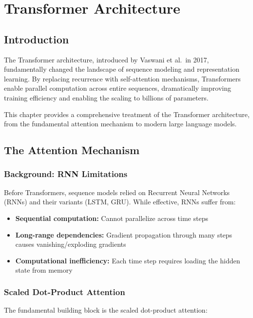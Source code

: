 \clearpage
\cleardoublepage

\chapter{Transformer Architecture}

\section{Introduction}

The Transformer architecture, introduced by Vaswani et al.\ in 2017, fundamentally changed the landscape of sequence modeling and representation learning. By replacing recurrence with self-attention mechanisms, Transformers enable parallel computation across entire sequences, dramatically improving training efficiency and enabling the scaling to billions of parameters.

This chapter provides a comprehensive treatment of the Transformer architecture, from the fundamental attention mechanism to modern large language models.

\section{The Attention Mechanism}

\subsection{Background: RNN Limitations}

Before Transformers, sequence models relied on Recurrent Neural Networks (RNNs) and their variants (LSTM, GRU). While effective, RNNs suffer from:
\begin{itemize}
    \item \textbf{Sequential computation:} Cannot parallelize across time steps
    \item \textbf{Long-range dependencies:} Gradient propagation through many steps causes vanishing/exploding gradients
    \item \textbf{Computational inefficiency:} Each time step requires loading the hidden state from memory
\end{itemize}

\subsection{Scaled Dot-Product Attention}

The fundamental building block is the scaled dot-product attention:

